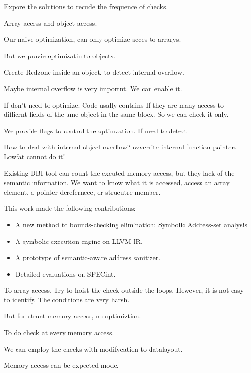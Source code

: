 Expore the solutions to recude the frequence of checks.

Array access and object access.

Our naive optimization, can only optimize acces to arrarys.

But we provie optimizatin to objects.

Create Redzone inside an object. to detect internal overflow.

Maybe internal overflow is very importnt.
We can enable it.



If don't need to optimize.
Code usally contains If they are many access to diffiernt fields of the ame object in the same block.
So we can check it only.


We provide flags to control the optimzation.
If need to detect

How to deal with internal object overflow? ovverrite internal function pointers.
Lowfat cannot do it!


Existing DBI tool can count the excuted memory access, but they lack of the semantic information.
We want to know what it is accessed, access an array element, a pointer derefernece, or strucutre member.


This work made the following contributions:

\begin{itemize}
  \item A new method to bounds-checking elimination: Symbolic Address-set analysis
  \item A symbolic execution engine on LLVM-IR.
  \item A prototype of semantic-aware address sanitizer.
  \item Detailed evaluations on SPECint.
\end{itemize}


To array access.
Try to hoist the check outside the loops.
However, it is not easy to identify.
The conditions are very harsh.

But for struct memory access, no optimiztion.

To do check at every memory access.

We can employ the checks with modifycation to
datalayout.

Memory access can be expected mode.





